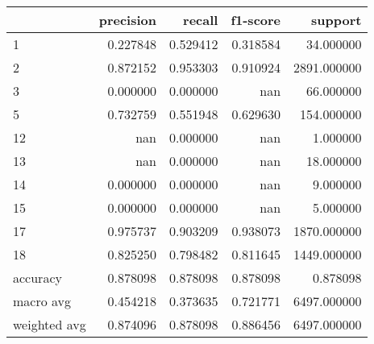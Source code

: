 \begin{tabular}{lrrrr}
\toprule
 & precision & recall & f1-score & support \\
\midrule
1 & 0.227848 & 0.529412 & 0.318584 & 34.000000 \\
2 & 0.872152 & 0.953303 & 0.910924 & 2891.000000 \\
3 & 0.000000 & 0.000000 & nan & 66.000000 \\
5 & 0.732759 & 0.551948 & 0.629630 & 154.000000 \\
12 & nan & 0.000000 & nan & 1.000000 \\
13 & nan & 0.000000 & nan & 18.000000 \\
14 & 0.000000 & 0.000000 & nan & 9.000000 \\
15 & 0.000000 & 0.000000 & nan & 5.000000 \\
17 & 0.975737 & 0.903209 & 0.938073 & 1870.000000 \\
18 & 0.825250 & 0.798482 & 0.811645 & 1449.000000 \\
accuracy & 0.878098 & 0.878098 & 0.878098 & 0.878098 \\
macro avg & 0.454218 & 0.373635 & 0.721771 & 6497.000000 \\
weighted avg & 0.874096 & 0.878098 & 0.886456 & 6497.000000 \\
\bottomrule
\end{tabular}
